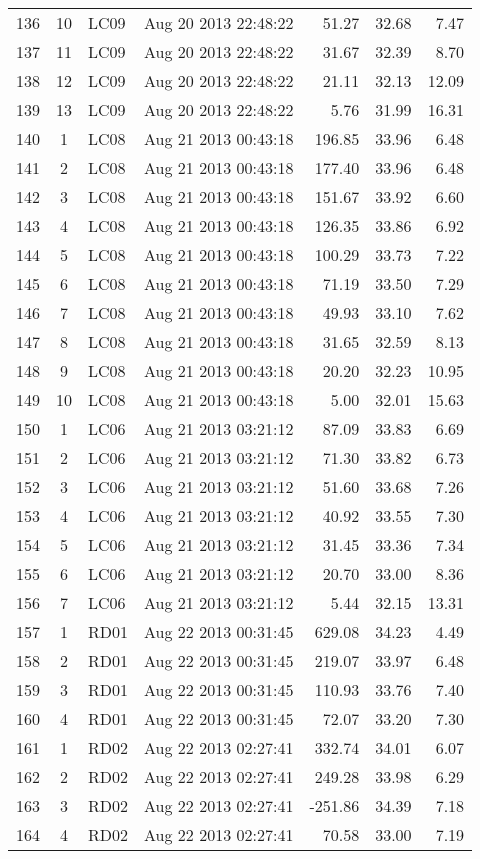 \documentclass{article}
\begin{document}
\begin{longtable}{ccllrrr}
136&10&LC09&Aug 20 2013 22:48:22&51.27&32.68&7.47\\
137&11&LC09&Aug 20 2013 22:48:22&31.67&32.39&8.70\\
138&12&LC09&Aug 20 2013 22:48:22&21.11&32.13&12.09\\
139&13&LC09&Aug 20 2013 22:48:22&5.76&31.99&16.31\\
\hline 
140&1&LC08&Aug 21 2013 00:43:18&196.85&33.96&6.48\\
141&2&LC08&Aug 21 2013 00:43:18&177.40&33.96&6.48\\
142&3&LC08&Aug 21 2013 00:43:18&151.67&33.92&6.60\\
143&4&LC08&Aug 21 2013 00:43:18&126.35&33.86&6.92\\
144&5&LC08&Aug 21 2013 00:43:18&100.29&33.73&7.22\\
145&6&LC08&Aug 21 2013 00:43:18&71.19&33.50&7.29\\
146&7&LC08&Aug 21 2013 00:43:18&49.93&33.10&7.62\\
147&8&LC08&Aug 21 2013 00:43:18&31.65&32.59&8.13\\
148&9&LC08&Aug 21 2013 00:43:18&20.20&32.23&10.95\\
149&10&LC08&Aug 21 2013 00:43:18&5.00&32.01&15.63\\
\hline 
150&1&LC06&Aug 21 2013 03:21:12&87.09&33.83&6.69\\
151&2&LC06&Aug 21 2013 03:21:12&71.30&33.82&6.73\\
152&3&LC06&Aug 21 2013 03:21:12&51.60&33.68&7.26\\
153&4&LC06&Aug 21 2013 03:21:12&40.92&33.55&7.30\\
154&5&LC06&Aug 21 2013 03:21:12&31.45&33.36&7.34\\
155&6&LC06&Aug 21 2013 03:21:12&20.70&33.00&8.36\\
156&7&LC06&Aug 21 2013 03:21:12&5.44&32.15&13.31\\
\hline 
157&1&RD01&Aug 22 2013 00:31:45&629.08&34.23&4.49\\
158&2&RD01&Aug 22 2013 00:31:45&219.07&33.97&6.48\\
159&3&RD01&Aug 22 2013 00:31:45&110.93&33.76&7.40\\
160&4&RD01&Aug 22 2013 00:31:45&72.07&33.20&7.30\\
\hline 
161&1&RD02&Aug 22 2013 02:27:41&332.74&34.01&6.07\\
162&2&RD02&Aug 22 2013 02:27:41&249.28&33.98&6.29\\
163&3&RD02&Aug 22 2013 02:27:41&-251.86&34.39&7.18\\
164&4&RD02&Aug 22 2013 02:27:41&70.58&33.00&7.19\\

\end{longtable}
\end{document}
